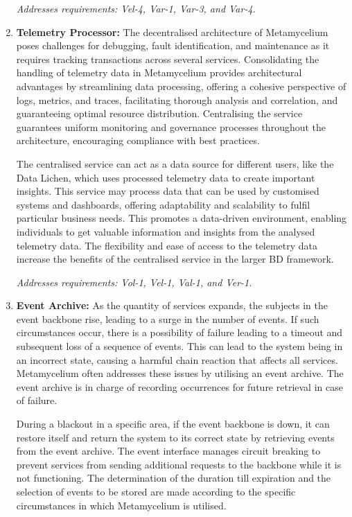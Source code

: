 \documentclass[preprint,12pt]{elsarticle}
\begin{document}
\begin{enumerate}
    \textit{Addresses requirements: Vel-4, Var-1, Var-3, and Var-4.} 
    
    
    \item \textbf{Telemetry Processor:}  The decentralised architecture of Metamycelium poses challenges for debugging, fault identification, and maintenance as it requires tracking transactions across several services. Consolidating the handling of telemetry data in Metamycelium provides architectural advantages by streamlining data processing, offering a cohesive perspective of logs, metrics, and traces, facilitating thorough analysis and correlation, and guaranteeing optimal resource distribution. Centralising the service guarantees uniform monitoring and governance processes throughout the architecture, encouraging compliance with best practices.

    The centralised service can act as a data source for different users, like the Data Lichen, which uses processed telemetry data to create important insights. This service may process data that can be used by customised systems and dashboards, offering adaptability and scalability to fulfil particular business needs. This promotes a data-driven environment, enabling individuals to get valuable information and insights from the analysed telemetry data. The flexibility and ease of access to the telemetry data increase the benefits of the centralised service in the larger BD framework.

    \textit{Addresses requirements: Vol-1, Vel-1, Val-1, and Ver-1.} 


    \item \textbf{Event Archive:} As the quantity of services expands, the subjects in the event backbone rise, leading to a surge in the number of events. If such circumstances occur, there is a possibility of failure leading to a timeout and subsequent loss of a sequence of events. This can lead to the system being in an incorrect state, causing a harmful chain reaction that affects all services. Metamycelium often addresses these issues by utilising an event archive. The event archive is in charge of recording occurrences for future retrieval in case of failure. 
    
    During a blackout in a specific area, if the event backbone is down, it can restore itself and return the system to its correct state by retrieving events from the event archive. The event interface manages circuit breaking to prevent services from sending additional requests to the backbone while it is not functioning. The determination of the duration till expiration and the selection of events to be stored are made according to the specific circumstances in which Metamycelium is utilised.



\end{enumerate}
\end{document}
